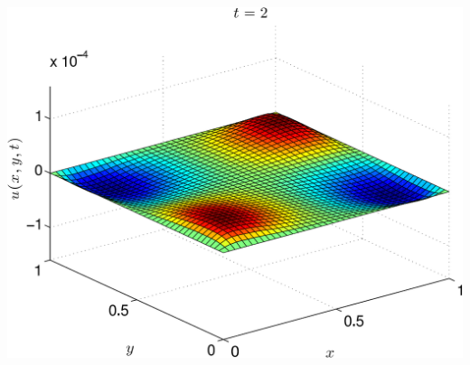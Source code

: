 \begin{enumerate}
\begin{center}\includegraphics[scale=0.6]{heat2d4} \end{center}
\end{enumerate}



